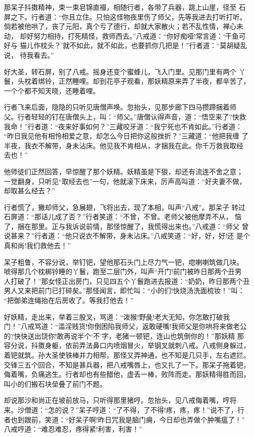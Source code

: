 那呆子抖擞精神，束一束皂锦直裰，相随行者，各带了兵器，跳上山崖，径至
石屏之下。行者道：“你且立住。只怕这怪物夜里伤了师父，先等我进去打听打听。
倘若被他哄了，丧了元阳，真个亏了德行，却就大家散火；若不乱性情，禅心未动，
却好努力相持，打死精怪，救师西去。”八戒道：“你好痴哑!常言道：‘干鱼可好与
猫儿作枕头？’就不如此，就不如此，也要抓你几把是！”行者道：“莫胡疑乱说，
待我看去。”

好大圣，转石屏，别了八戒。摇身还变个蜜蜂儿，飞入门里。见那门里有两个
丫鬟，头枕着绑铃，正然睡哩。却到花亭子观看，那妖精原来弄了半夜，都辛苦了，
一个个都不知天晓，还睡着哩。

行者飞来后面，隐隐的只听见唐僧声唤。忽抬头，见那步廊下四马攒蹄捆着师
父。行者轻轻的钉在唐僧头上，叫：“师父。”唐僧认得声音，道：“悟空来了?快救
我命！”行者道：“夜来好事如何？”三藏咬牙道：“我宁死也不肯如此。”行者道：
“昨日我见他有相怜相爱之意，却怎么今日把你这般挫折？”三藏道：“他把我缠
了半夜，我衣不解带，身未沾床。他见我不肯相从，才捆我在此。你千万救我取经
去也！”

他师徒们正然回答，早惊醒了那个妖精。妖精虽是下狠，却还有流连不舍之意；
一觉翻身，只听见“取经去也”一句，他就滚下床来，厉声高叫道：“好夫妻不做，
却取甚么经去？”

行者慌了，撇却师父，急展翅，飞将出去，现了本相，叫声“八戒”。那呆子
转过石屏道：“那话儿成了否？”行者笑道：“不曾，不曾。老师父被他摩弄不从，
恼了，捆在那里。正与我诉说前情，那怪惊醒了，我慌得出来也。”八戒道：“师父
曾说甚来？”行者道：“他只说衣不解带，身未沾床。”八戒笑道：“好，好，好!还
是个真和尚!我们救他去！”

呆子粗鲁，不容分说，举钉钯，望他那石头门上尽力气一钯，唿喇喇筑做几块。
唬得那几个枕梆铃睡的丫鬟，跑至二层门外，叫声“开门!前门被昨日那两个丑男
人打破了！”那女怪正出房门，只见四五个丫鬟跑进去报道：“奶奶，昨日那两个丑
男人又来把前门已打碎矣。”那怪闻言，即忙叫：“小的们!快烧汤洗面梳妆！”叫：
“把御弟连绳抬在后房收了。等我打他去！”

好妖精，走出来，举着三股叉，骂道：“泼猴!野彘!老大无知，你怎敢打破我
门！”八戒骂道：“滥淫贱货!你倒困陷我师父，返敢硬嘴!我师父是你哄将来做老公
的?快快送出饶你!敢再说半个‘不’字，老猪一顿钯，连山也筑倒你的！”那妖精
那容分说，抖擞身躯，依前弄法鼻口内喷烟冒火，举钢叉就刺八戒。八戒侧身躲过，
着钯就筑。孙大圣使铁棒并力相帮。那怪又弄神通，也不知是几只手，左右遮拦。
交锋三五个回合，不知是甚兵器，把八戒嘴唇上，也又扎了一下。那呆子拖着钯，
侮着嘴，负痛逃生。行者却也有些醋他，虚丢一棒，败阵而走。那妖精得胜而回，
叫小的们搬石块垒叠了前门不题。

却说那沙和尚正在坡前放马，只听得那里猪哼。忽抬头，见八戒侮着嘴，哼将
来。沙僧道：“怎的说？”呆子哼道：“了不得，了不得!疼，疼，疼！”说不了，行
者也到跟前，笑道：“好呆子啊!昨日咒我是脑门痈，今日却也弄做个肿嘴瘟了！”
八戒哼道：“难忍难忍，疼得紧!利害，利害！”

